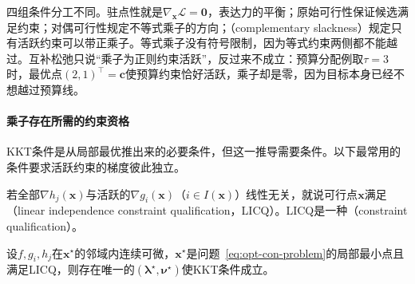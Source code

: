 四组条件分工不同。驻点性就是$\nabla_{\bm x}\mathcal L=\bm0$，表达力的平衡；原始可行性保证候选满足约束；对偶可行性规定不等式乘子的方向；（complementary slackness）规定只有活跃约束可以带正乘子。等式乘子没有符号限制，因为等式约束两侧都不能越过。互补松弛只说“乘子为正则约束活跃”，反过来不成立：预算分配例取$\tau=3$时，最优点$(2,1)^\top=\bm c$使预算约束恰好活跃，乘子却是零，因为目标本身已经不想越过预算线。

\paragraph{乘子存在所需的约束资格}
KKT条件是从局部最优推出来的必要条件，但这一推导需要条件。以下最常用的条件要求活跃约束的梯度彼此独立。

\begin{definition}[线性无关约束资格]
\label{def:opt-con-licq}
若全部$\nabla h_j(\bm x)$与活跃的$\nabla g_i(\bm x)$（$i\in I(\bm x)$）线性无关，就说可行点$\bm x$满足（linear independence constraint qualification，LICQ）。LICQ是一种（constraint qualification）。
\end{definition}

\begin{theorem}[LICQ下KKT条件的必要性]
\label{thm:opt-con-kkt-necessary}
设$f,g_i,h_j$在$\bm x^\star$的邻域内连续可微，$\bm x^\star$是问题~\eqref{eq:opt-con-problem}的局部最小点且满足LICQ，则存在唯一的$(\bm\lambda^\star,\bm\nu^\star)$使KKT条件成立。
\end{theorem}

